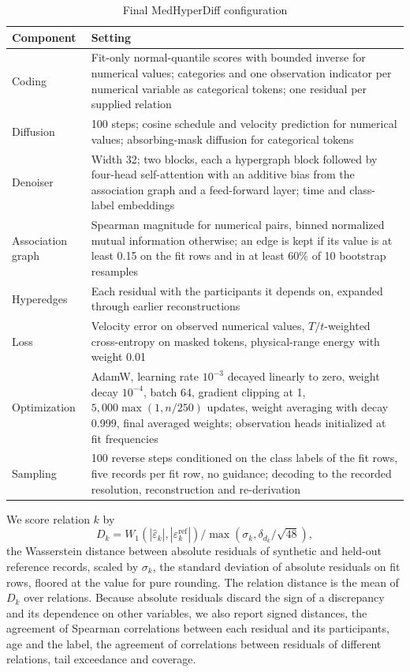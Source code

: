 \documentclass[conference]{IEEEtran}
\begin{document}
\begin{table}[t]
\caption{Final MedHyperDiff configuration}
\label{tab:config}
\centering
\setlength{\tabcolsep}{3pt}
\begin{tabular}{p{1.9cm}p{6.1cm}}
\toprule
Component & Setting \\
\midrule
Coding & Fit-only normal-quantile scores with bounded inverse for numerical values; categories and one observation indicator per numerical variable as categorical tokens; one residual per supplied relation \\
Diffusion & 100 steps; cosine schedule and velocity prediction for numerical values; absorbing-mask diffusion for categorical tokens \\
Denoiser & Width 32; two blocks, each a hypergraph block followed by four-head self-attention with an additive bias from the association graph and a feed-forward layer; time and class-label embeddings \\
Association graph & Spearman magnitude for numerical pairs, binned normalized mutual information otherwise; an edge is kept if its value is at least 0.15 on the fit rows and in at least 60\% of 10 bootstrap resamples \\
Hyperedges & Each residual with the participants it depends on, expanded through earlier reconstructions \\
Loss & Velocity error on observed numerical values, $T/t$-weighted cross-entropy on masked tokens, physical-range energy with weight 0.01 \\
Optimization & AdamW, learning rate $10^{-3}$ decayed linearly to zero, weight decay $10^{-4}$, batch 64, gradient clipping at 1, $5{,}000\max(1, n/250)$ updates, weight averaging with decay 0.999, final averaged weights; observation heads initialized at fit frequencies \\
Sampling & 100 reverse steps conditioned on the class labels of the fit rows, five records per fit row, no guidance; decoding to the recorded resolution, reconstruction and re-derivation \\
\bottomrule
\end{tabular}
\end{table}

We score relation $k$ by
\begin{equation}
D_k = W_1\!\left(|\hat{\varepsilon}_k|, |\varepsilon_k^{\mathrm{ref}}|\right) / \max\!\left(\sigma_k, \delta_{d_k}/\sqrt{48}\right),
\label{eq:metric}
\end{equation}
the Wasserstein distance between absolute residuals of synthetic and held-out reference records, scaled by $\sigma_k$, the standard deviation of absolute residuals on fit rows, floored at the value for pure rounding. The relation distance is the mean of $D_k$ over relations. Because absolute residuals discard the sign of a discrepancy and its dependence on other variables, we also report signed distances, the agreement of Spearman correlations between each residual and its participants, age and the label, the agreement of correlations between residuals of different relations, tail exceedance and coverage.
\end{document}
